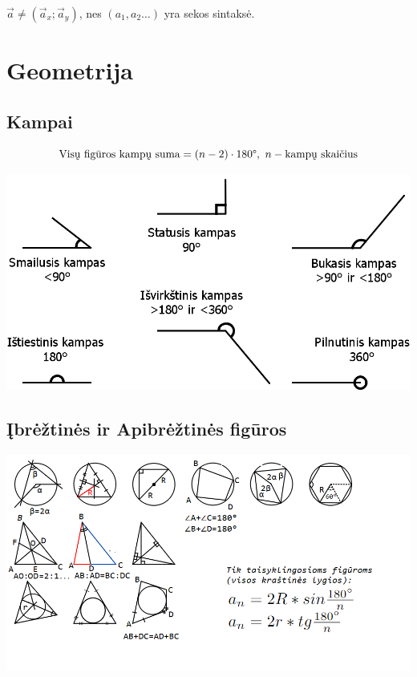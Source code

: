 \documentclass[fleqn]{article} %
\begin{document}
$\vec{a} \ne (\vec{a}_x; \vec{a}_y)$, nes $(a_1, a_2 \dots )$ yra sekos sintaksė.

\clearpage

\section{Geometrija}

\subsection{Kampai}

\begin{equation}
    \text{Visų figūros kampų suma} = (n - 2) \cdot 180\degree,\ n - \text{kampų skaičius}
\end{equation}

\includegraphics[max width=\textwidth]{assets/angle_types.png}

\subsection{Įbrėžtinės ir Apibrėžtinės figūros}

\includegraphics[max width = \textwidth]{assets/geometry.png}
\end{document}
